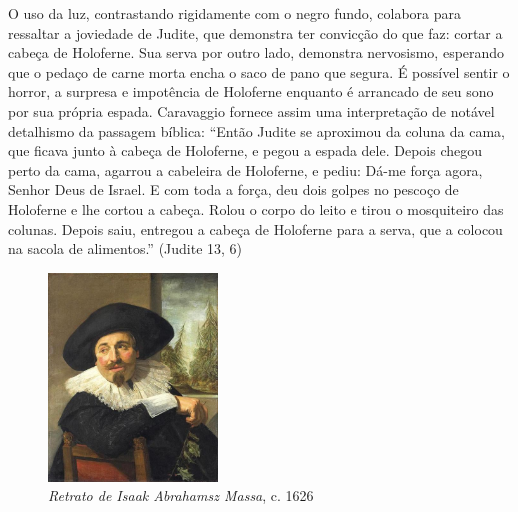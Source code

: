 O uso da luz, contrastando rigidamente com o negro fundo, colabora para
ressaltar a joviedade de Judite, que demonstra ter convicção do que faz: cortar
a cabeça de Holoferne. Sua serva por outro lado, demonstra nervosismo, esperando
que o pedaço de carne morta encha o saco de pano que segura. É possível sentir o
horror, a surpresa e impotência de Holoferne enquanto é arrancado de seu sono
por sua própria espada. Caravaggio fornece assim uma interpretação de notável
detalhismo da passagem bíblica: ``Então Judite se aproximou da coluna da cama,
que ficava junto à cabeça de Holoferne, e pegou a espada dele. Depois chegou
perto da cama, agarrou a cabeleira de Holoferne, e pediu: Dá-me força agora,
Senhor Deus de Israel. E com toda a força, deu dois golpes no pescoço de
Holoferne e lhe cortou a cabeça. Rolou o corpo do leito e tirou o mosquiteiro
das colunas. Depois saiu, entregou a cabeça de Holoferne para a serva, que a
colocou na sacola de alimentos.'' (Judite 13, 6)

\begin{figure}
  \begin{center}
    \includegraphics[width=0.4\textwidth]{figs/hals_massa.png}
  \end{center}
  \caption{\emph{Retrato de Isaak Abrahamsz Massa}, c. 1626}
  \label{fig:hals:massa}
\end{figure}

